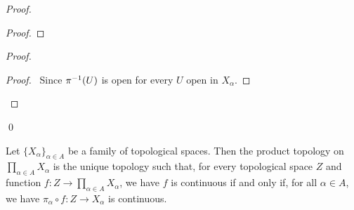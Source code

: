 \begin{proof}
\pf
{}
\begin{proof}
\end{proof}
\begin{proof}
	\begin{proof}
		\pf\ Since ${\pi}^{-1}(U)$ is open for every $U$ open in $X_\alpha$.
	\end{proof}
\end{proof}
\qed
\end{proof}

\begin{thm}
\label{thm:product_universal}
Let $\{ X_\alpha \}_{\alpha \in A}$ be a family of topological spaces. Then the product topology on $\prod_{\alpha \in A} X_\alpha$ is the unique topology such that, for every topological space $Z$ and function $f : Z \rightarrow \prod_{\alpha \in A} X_\alpha$, we have $f$ is continuous if and only if, for all $\alpha \in A$, we have $\pi_\alpha \circ f : Z \rightarrow X_\alpha$ is continuous.
\end{thm}

